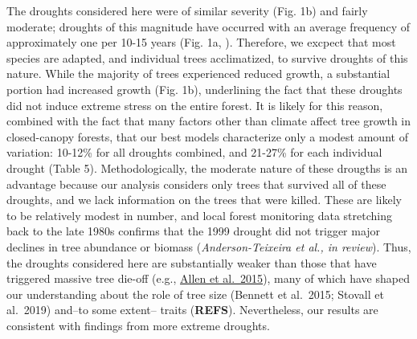 \documentclass[]{article}
\begin{document}
The droughts considered here were of similar severity (Fig. 1b) and
fairly moderate; droughts of this magnitude have occurred with an
average frequency of approximately one per 10-15 years (Fig. 1a,
\citet{helcoski_growing_2019}). Therefore, we excpect that most species
are adapted, and individual trees acclimatized, to survive droughts of
this nature. While the majority of trees experienced reduced growth, a
substantial portion had increased growth (Fig. 1b), underlining the fact
that these droughts did not induce extreme stress on the entire forest.
It is likely for this reason, combined with the fact that many factors
other than climate affect tree growth in closed-canopy forests, that our
best models characterize only a modest amount of variation: 10-12\% for
all droughts combined, and 21-27\% for each individual drought (Table
5). Methodologically, the moderate nature of these drougths is an
advantage because our analysis considers only trees that survived all of
these droughts, and we lack information on the trees that were killed.
These are likely to be relatively modest in number, and local forest
monitoring data stretching back to the late 1980s confirms that the 1999
drought did not trigger major declines in tree abundance or biomass
(\emph{Anderson-Teixeira et al., in review}). Thus, the droughts
considered here are substantially weaker than those that have triggered
massive tree die-off (e.g.,
\href{https://doi.org/10.1016/j.foreco.2009.09.001}{Allen et al.~2015}),
many of which have shaped our understanding about the role of tree size
(Bennett et al.~2015; Stovall et al.~2019) and--to some extent-- traits
(\textbf{REFS}). Nevertheless, our results are consistent with findings
from more extreme droughts.
\end{document}
